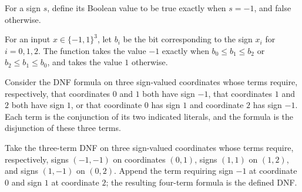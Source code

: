 \begin{definition}
\label{FABL.signToBit}
\leanok
{}
For a sign $s$, define its Boolean value to be true exactly when $s=-1$, and false
otherwise.
\end{definition}

\begin{definition}
\label{FABL.sort3}
\leanok
{}
For an input $x\in\{-1,1\}^3$, let $b_i$ be the bit corresponding to the sign $x_i$ for
$i=0,1,2$. The function takes the value $-1$ exactly when $b_0\le b_1\le b_2$ or $b_2\le
b_1\le b_0$, and takes the value $1$ otherwise.
\end{definition}

\begin{definition}
\label{FABL.sort3ReducedDNF}
\leanok
{}
Consider the DNF formula on three sign-valued coordinates whose terms require,
respectively, that coordinates $0$ and $1$ both have sign $-1$, that coordinates $1$ and
$2$ both have sign $1$, or that coordinate $0$ has sign $1$ and coordinate $2$ has sign
$-1$. Each term is the conjunction of its two indicated literals, and the formula is the
disjunction of these three terms.
\end{definition}

\begin{definition}
\label{FABL.sort3DNF}
\leanok
{}
Take the three-term DNF on three sign-valued coordinates whose terms require,
respectively, signs $(-1,-1)$ on coordinates $(0,1)$, signs $(1,1)$ on $(1,2)$, and
signs $(1,-1)$ on $(0,2)$. Append the term requiring sign $-1$ at coordinate $0$ and
sign $1$ at coordinate $2$; the resulting four-term formula is the defined DNF.
\end{definition}

